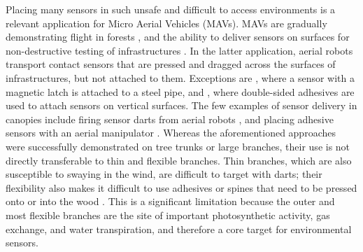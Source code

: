 Placing many sensors in such unsafe and difficult to access environments is a relevant application for Micro Aerial Vehicles (MAVs). MAVs are gradually demonstrating flight in forests \cite{Mulgaonkar2018b, Tan2017, Zheng2020}, and the ability to deliver sensors on surfaces for non-destructive testing of infrastructures \cite{Gonzalez-deSantos2019, Ikeda2017, Bodie2019}. In the latter application, aerial robots transport contact sensors that are pressed and dragged across the surfaces of infrastructures, but not attached to them. Exceptions are \cite{Jarvis2018}, where a sensor with a magnetic latch is attached to a steel pipe, and \cite{McArthur2018b}, where double-sided adhesives are used to attach sensors on vertical surfaces. The few examples of sensor delivery in canopies include firing sensor darts from aerial robots \cite{Farinha2020}, and placing adhesive sensors with an aerial manipulator \cite{Hamaza2019}. Whereas the aforementioned approaches were successfully demonstrated on tree trunks or large branches, their use is not directly transferable to thin and flexible branches. Thin branches, which are also susceptible to swaying in the wind, are difficult to target with darts; their flexibility also makes it difficult to use adhesives or spines that need to be pressed onto or into the wood \cite{Farinha2020}. This is a significant limitation because the outer and most flexible branches are the site of important photosynthetic activity, gas exchange, and water transpiration, and therefore a core target for environmental sensors.

